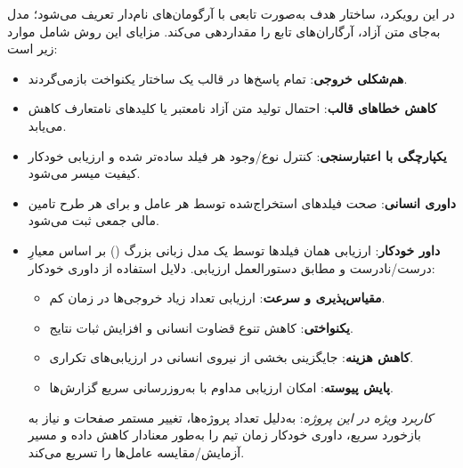 
در این رویکرد، ساختار هدف به‌صورت تابعی با آرگومان‌های نام‌دار تعریف می‌شود؛ مدل به‌جای متن آزاد، آرگاران‌های تابع را مقداردهی می‌کند. مزایای این روش شامل موارد زیر است:
\begin{itemize}
\item \textbf{هم‌شکلی خروجی}: تمام پاسخ‌ها در قالب یک ساختار یکنواخت بازمی‌گردند.
\item \textbf{کاهش خطاهای قالب}: احتمال تولید متن آزاد نامعتبر یا کلیدهای نامتعارف کاهش می‌یابد.
\item \textbf{یکپارچگی با اعتبارسنجی}: کنترل نوع/وجود هر فیلد ساده‌تر شده و ارزیابی خودکار کیفیت میسر می‌شود.
\end{itemize}


\begin{itemize}
\item \textbf{داوری انسانی}: صحت فیلدهای استخراج‌شده توسط هر عامل و برای هر طرح تامین مالی جمعی ثبت می‌شود.
\item \textbf{داور خودکار}: ارزیابی همان فیلدها توسط یک مدل زبانی بزرگ () بر اساس معیارِ درست/نادرست و مطابق دستورالعمل ارزیابی. دلایل استفاده از داوری خودکار:
\begin{itemize}
\item \textbf{مقیاس‌پذیری و سرعت}: ارزیابی تعداد زیاد خروجی‌‌ها در زمان کم.
\item \textbf{یکنواختی}: کاهش تنوع قضاوت انسانی و افزایش ثبات نتایج.
\item \textbf{کاهش هزینه}: جایگزینی بخشی از نیروی انسانی در ارزیابی‌های تکراری.
\item \textbf{پایش پیوسته}: امکان ارزیابی مداوم با به‌روزرسانی سریع گزارش‌ها.
\end{itemize}
\textit{کاربرد ویژه در این پروژه}: به‌دلیل تعداد پروژه‌ها، تغییر مستمر صفحات و نیاز به بازخورد سریع، داوری خودکار زمان تیم را به‌طور معنادار کاهش داده و مسیر آزمایش/مقایسه عامل‌ها را تسریع می‌کند.
\end{itemize}

